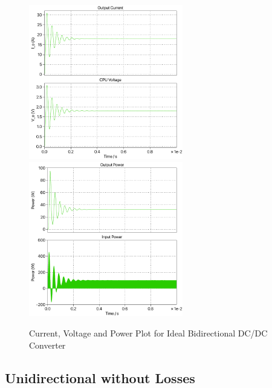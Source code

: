 \documentclass{article}
\begin{document}
\begin{figure}[H]
    \centering{}
    \includegraphics[width=0.6\textwidth]{img/ideal-I-V-bidirectional.pdf}
    \includegraphics[width=0.6\textwidth]{img/ideal-power-bidirectional.pdf}
    \label{fig:ideal-bi-plots}
    \caption{Current, Voltage and Power Plot for Ideal Bidirectional DC/DC Converter}
\end{figure}

\subsection{Unidirectional without Losses}
\end{document}
